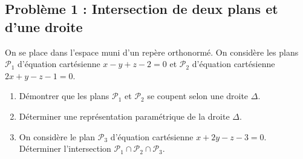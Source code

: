 \subsection*{Problème 1 : Intersection de deux plans et d'une droite}
On se place dans l'espace muni d'un repère orthonormé. On considère les plans $\mathcal{P}_1$ d'équation cartésienne $x - y + z - 2 = 0$ et $\mathcal{P}_2$ d'équation cartésienne $2x + y - z - 1 = 0$.
\begin{enumerate}
    \item Démontrer que les plans $\mathcal{P}_1$ et $\mathcal{P}_2$ se coupent selon une droite $\Delta$.
    \item Déterminer une représentation paramétrique de la droite $\Delta$.
    \item On considère le plan $\mathcal{P}_3$ d'équation cartésienne $x + 2y - z - 3 = 0$. Déterminer l'intersection $\mathcal{P}_1 \cap \mathcal{P}_2 \cap \mathcal{P}_3$.
\end{enumerate}

